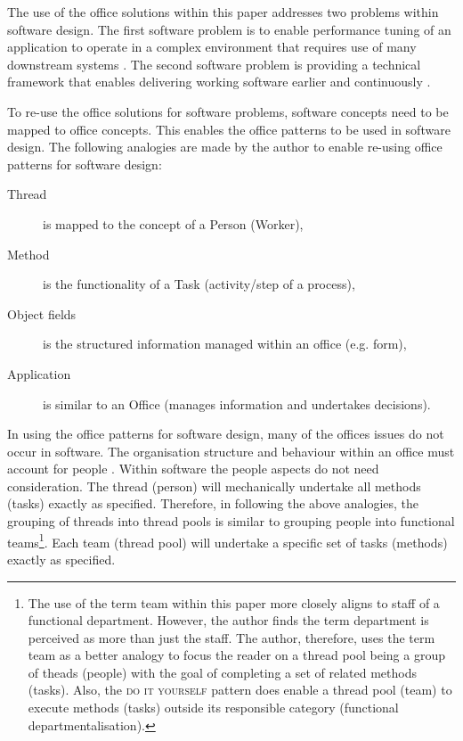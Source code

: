 \documentclass[prodmode]{style/acmlarge}
\begin{document}
The use of the office solutions within this paper addresses two problems within
software design.  The first software problem is to enable performance tuning of
an application to operate in a complex environment that requires use of many
downstream systems \cite{reverse-ten-k-problem}.  The second software problem is
providing a technical framework that enables delivering working software earlier
and continuously \cite{agile-manifesto}.

To re-use the office solutions for software problems, software concepts need to
be mapped to office concepts.  This enables the office patterns to be used in
software design.  The following analogies are made by the author to enable
re-using office patterns for software design:
\begin{description}
  \item[Thread] is mapped to the concept of a Person (Worker),
  \item[Method] is the functionality of a Task (activity/step of a process),
  \item[Object fields] is the structured information managed within an office (e.g. form),
  \item[Application] is similar to an Office (manages information and undertakes decisions).
\end{description}

In using the office patterns for software design, many of the offices issues do
not occur in software.  The organisation structure and behaviour within an
office must account for people \cite{organisational-behaviour}.  Within software
the people aspects do not need consideration.  The thread (person) will
mechanically undertake all methods (tasks) exactly as specified.  Therefore, in
following the above analogies, the grouping of threads into thread pools is
similar to grouping people into functional teams\footnote{The use of the term
team within this paper more closely aligns to staff of a functional department.
However, the author finds the term department is perceived as more than just the
staff.  The author, therefore, uses the term team as a better analogy to focus
the reader on a thread pool being a group of theads (people) with the goal of
completing a set of related methods (tasks).  Also, the \textsc{do it yourself}
pattern does enable a thread pool (team) to execute methods (tasks) outside its
responsible category (functional departmentalisation).}.  Each team (thread
pool) will undertake a specific set of tasks (methods) exactly as specified.
\end{document}

